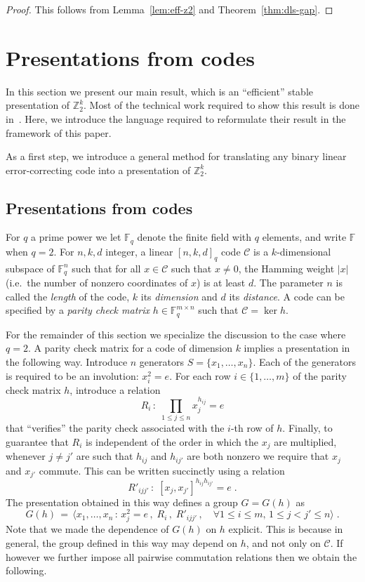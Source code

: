 \documentclass[11pt]{article}
\theoremstyle{definition}
\newcommand{\code}{\mathscr{C}}
\newcommand{\F}{\ensuremath{\mathbb{F}}}
\newcommand{\Z}{\ensuremath{\mathbb{Z}}}
\begin{document}
\begin{proof}
This follows from Lemma~\ref{lem:eff-z2} and Theorem~\ref{thm:dls-gap}.
\end{proof}

\section{Presentations from codes}

In this section we present our main result, which is an ``efficient'' stable presentation of $\Z_2^k$. Most of the technical work required to show this result is done in~\cite{ji2020mip}. Here, we introduce the language required to reformulate their result in the framework of this paper. 

As a first step, we introduce a general method for translating any binary linear error-correcting code into a presentation of $\Z_2^k$. 

\subsection{Presentations from codes}
\label{sec:pres-code}

For $q$ a prime power we let $\F_q$ denote the finite field with $q$ elements, and write $\F$ when $q=2$. 
For $n,k,d$ integer, a linear $[n,k,d]_q$ code $\code$ is a $k$-dimensional subspace of $\F_q^n$ such that for all $x\in \code$ such that $x\neq 0$, the Hamming weight $|x|$ (i.e.\ the number of nonzero coordinates of $x$) is at least $d$. The parameter $n$ is called the \emph{length} of the code, $k$ its \emph{dimension} and $d$ its \emph{distance}. A code can be specified by a \emph{parity check matrix} $h\in \F_q^{m\times n}$ such that $\code = \ker h$. 

For the remainder of this section we specialize the discussion to the case where $q=2$. 
A parity check matrix for a code of dimension $k$ implies a presentation in the following way. Introduce $n$ generators $S=\{x_1,\ldots,x_n\}$. Each of the generators is required to be an involution: $x_i^2=e$. For each row $i\in \{1,\ldots,m\}$ of the parity check matrix $h$, introduce a relation 
\[ R_i\,:\; \prod_{1\leq j \leq n} x_j^{h_{ij}}=e \]
that ``verifies'' the parity check associated with the $i$-th row of $h$. Finally, to guarantee that $R_i$ is independent of the order in which the $x_j$ are multiplied, whenever $j\neq j'$ are such that $h_{ij}$ and $h_{ij'}$ are both nonzero we require that $x_j$ and $x_{j'}$ commute. This can be written succinctly using a relation 
\[ R'_{ijj'}\,:\; [x_j,x_{j'}]^{h_{ij} h_{ij'}}=e\;.\]
The presentation obtained in this way defines a group $G=G(h)$ as 
\begin{equation}\label{eq:def-gh-pres}
 G(h) \,=\, \big\langle x_1,\ldots,x_n \,:\, x_j^2=e\,,\; R_i\,,\; R'_{ijj'}\,,\quad \forall 1\leq i\leq m,\, 1\leq j< j' \leq n\big\rangle\;.
\end{equation}
Note that we made the dependence of $G(h)$ on $h$ explicit. This is because in general, the group defined in this way may depend on $h$, and not only on $\code$. If however we further impose all pairwise commutation relations then we obtain the following. 
\end{document}
